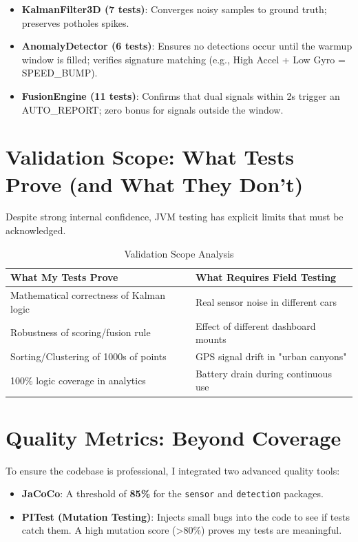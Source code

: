 \begin{itemize}
    \item \textbf{KalmanFilter3D (7 tests)}: Converges noisy samples to ground truth; preserves potholes spikes.
    \item \textbf{AnomalyDetector (6 tests)}: Ensures no detections occur until the warmup window is filled; verifies signature matching (e.g., High Accel + Low Gyro = SPEED\_BUMP).
    \item \textbf{FusionEngine (11 tests)}: Confirms that dual signals within 2s trigger an AUTO\_REPORT; zero bonus for signals outside the window.
\end{itemize}

\section{Validation Scope: What Tests Prove (and What They Don't)}
Despite strong internal confidence, JVM testing has explicit limits that must be acknowledged.

\begin{table}[ht]
\centering
\caption{Validation Scope Analysis}
{\small
\begin{tabular}{@{}L{4.9cm}L{4.9cm}@{}}
\toprule
\textbf{What My Tests Prove} & \textbf{What Requires Field Testing} \\ \midrule
Mathematical correctness of Kalman logic & Real sensor noise in different cars \\
Robustness of scoring/fusion rule & Effect of different dashboard mounts \\
Sorting/Clustering of 1000s of points & GPS signal drift in "urban canyons" \\
100\% logic coverage in analytics & Battery drain during continuous use \\ \bottomrule
\end{tabular}
}
\end{table}

\section{Quality Metrics: Beyond Coverage}
To ensure the codebase is professional, I integrated two advanced quality tools:

\begin{itemize}
    \item \textbf{JaCoCo}: A threshold of \textbf{85\%} for the \texttt{sensor} and \texttt{detection} packages.
    \item \textbf{PITest (Mutation Testing)}: Injects small bugs into the code to see if tests catch them. A high mutation score (>80\%) proves my tests are meaningful.
\end{itemize}

